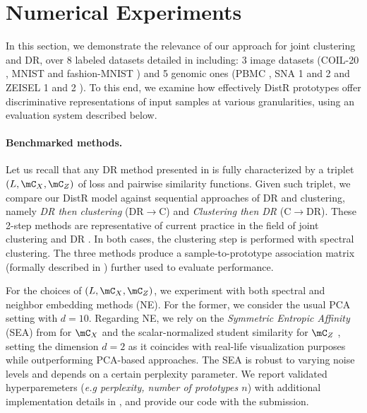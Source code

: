 
\section{Numerical Experiments}\label{sec:exps_distr}

In this section, we demonstrate the relevance of our approach for joint clustering and DR,  over 8 labeled datasets detailed in  including: 3 image datasets (COIL-20 \citep{nene1996columbia}, MNIST and fashion-MNIST \citep{xiao2017fashion}) and 5 genomic ones (PBMC \citep{wolf2018scanpy}, SNA 1 and 2 \citep{chen2019high} and ZEISEL 1 and 2 \citep{zeisel2015cell}). To this end, we examine how effectively DistR prototypes offer discriminative representations of input samples at various granularities, using an evaluation system described below.

\paragraph{Benchmarked methods.}
Let us recall that any DR method presented in  is fully characterized by a triplet $(L, \mC_X, \mC_Z)$ of loss and pairwise similarity functions.
Given such triplet, we compare our DistR model against sequential approaches of DR and clustering, namely \emph{DR then clustering} (DR$\to$C) and \emph{Clustering then DR} (C$\to$DR). These 2-step methods are representative of current practice in the field of joint clustering and DR \citep{baran2019metacell}. In both cases, the clustering step is performed with spectral clustering. The three methods produce a sample-to-prototype association matrix (formally described in ) further used to evaluate performance.

For the choices of $(L, \mC_X, \mC_Z)$, we experiment with both spectral and neighbor embedding methods (NE). For the former, we consider the usual PCA setting with $d = 10$. Regarding NE, we rely on the \emph{Symmetric Entropic Affinity} (SEA) from \citep{van2023snekhorn} for $\mC_X$ and the scalar-normalized student similarity for $\mC_Z$ \citep{van2008visualizing}, setting the dimension $d=2$ as it coincides with real-life visualization purposes while outperforming PCA-based approaches. The SEA is robust to varying noise levels and depends on a certain perplexity parameter. We report validated hyperparemeters (\emph{e.g perplexity, number of prototypes $n$}) with additional implementation details in , and provide our code with the submission. 

